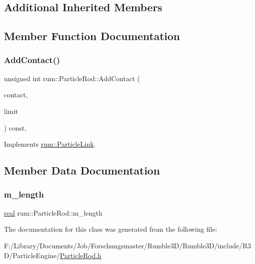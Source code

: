 \subsection*{Additional Inherited Members}


\subsection{Member Function Documentation}
\mbox{\label{classrum_1_1_particle_rod_abc0fad39193787cb65e937cd7d20874e}} 
\subsubsection{\texorpdfstring{Add\+Contact()}{AddContact()}}
{\footnotesize\ttfamily unsigned int rum\+::\+Particle\+Rod\+::\+Add\+Contact (\begin{DoxyParamCaption}\item[{\hyperlink{classrum_1_1_particle_contact}{Particle\+Contact} $\ast$}]{contact,  }\item[{unsigned int}]{limit }\end{DoxyParamCaption}) const\hspace{0.3cm}{\ttfamily [override]}, {\ttfamily [virtual]}}



Implements \hyperlink{classrum_1_1_particle_link_a86e7dbac23cd26fce627bf5ed1fae6f5}{rum\+::\+Particle\+Link}.



\subsection{Member Data Documentation}
\mbox{\label{classrum_1_1_particle_rod_a9f5c266ef3a91afc3f3c41b7c0f300a9}} 
\subsubsection{\texorpdfstring{m\+\_\+length}{m\_length}}
{\footnotesize\ttfamily \hyperlink{namespacerum_a7e8cca23573d5eaead0f138cbaa4862c}{real} rum\+::\+Particle\+Rod\+::m\+\_\+length\hspace{0.3cm}{\ttfamily [protected]}}



The documentation for this class was generated from the following file\+:\begin{DoxyCompactItemize}
\item 
F\+:/\+Library/\+Documents/\+Job/\+Forschungsmaster/\+Rumble3\+D/\+Rumble3\+D/include/\+R3\+D/\+Particle\+Engine/\hyperlink{_particle_rod_8h}{Particle\+Rod.\+h}\end{DoxyCompactItemize}
